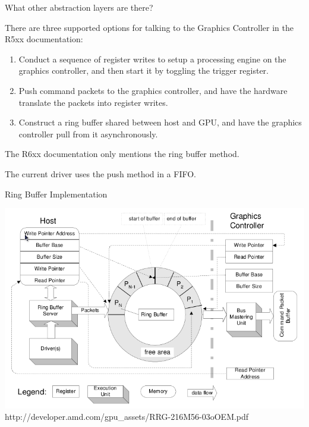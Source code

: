 \documentclass[xcolor=dvipsnames]{beamer}
\begin{document}
\begin{frame}[t]{What other abstraction layers are there?}

	There are three supported options for talking to the Graphics Controller in the R5xx documentation:
	\begin{enumerate}
		\pause
		\item Conduct a sequence of register writes to setup a processing engine on the graphics controller, and then start it by toggling the trigger register.

		\pause
		\item Push command packets to the graphics controller, and have the hardware translate the packets into register writes.

		\pause
		\item Construct a ring buffer shared between host and GPU, and have the graphics controller pull from it asynchronously.
	\end{enumerate}

	\pause
	The R6xx documentation only mentions the ring buffer method.

	The current driver uses the push method in a FIFO.

\end{frame}


\begin{frame}{Ring Buffer Implementation}
	\begin{center}
		\includegraphics[scale=0.30]{ringbuf.png} \\
		\footnotesize{http://developer.amd.com/gpu\_assets/RRG-216M56-03oOEM.pdf}
	\end{center}
\end{frame}
\end{document}
